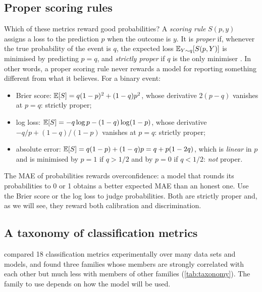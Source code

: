 \subsection{Proper scoring rules}

Which of these metrics reward good probabilities? A \emph{scoring rule} $S(p,y)$
assigns a loss to the prediction $p$ when the outcome is $y$. It is \emph{proper} if, whenever
the true probability of the event is $q$, the expected loss $\mathbb{E}_{Y\sim q}[S(p,Y)]$ is minimised
by predicting $p=q$, and \emph{strictly proper} if $q$ is the only minimiser
\citep{gneiting2007strictly}. In other words, a proper scoring rule never rewards a model for
reporting something different from what it believes. For a binary event:
\begin{itemize}
  \item Brier score: $\mathbb{E}[S]=q(1-p)^2+(1-q)p^2$, whose derivative $2(p-q)$ vanishes at $p=q$:
        strictly proper;
  \item log loss: $\mathbb{E}[S]=-q\log p-(1-q)\log(1-p)$, whose derivative $-q/p+(1-q)/(1-p)$ vanishes
        at $p=q$: strictly proper;
  \item absolute error: $\mathbb{E}[S]=q(1-p)+(1-q)p=q+p(1-2q)$, which is \emph{linear} in $p$ and is
        minimised by $p=1$ if $q>1/2$ and by $p=0$ if $q<1/2$: \emph{not} proper.
\end{itemize}

\begin{keyidea}
The MAE of probabilities rewards overconfidence: a model that rounds its probabilities to 0
or 1 obtains a better expected MAE than an honest one. Use the Brier score or the log loss to
judge probabilities. Both are strictly proper and, as we will see, they reward both
calibration and discrimination.
\end{keyidea}

\subsection{A taxonomy of classification metrics}

\citet{ferri2009experimental} compared 18 classification metrics experimentally over many data
sets and models, and found three families whose members are strongly correlated with each
other but much less with members of other families (\cref{tab:taxonomy}). The family to use
depends on how the model will be used.

